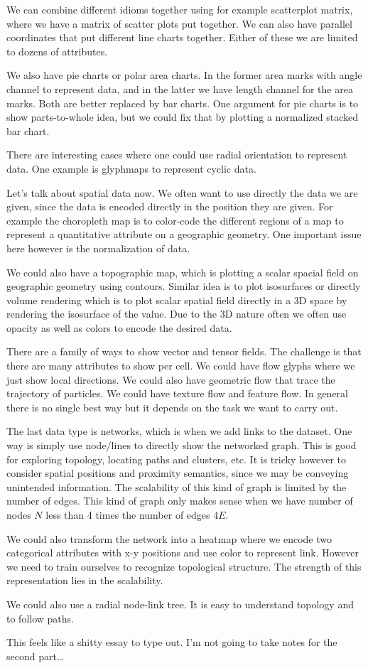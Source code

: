 \documentclass[letterpaper, 11pt]{article}
\numberwithin{equation}{section}
\numberwithin{figure}{section}
\begin{document}
We can combine different idioms together using for example scatterplot matrix,
where we have a matrix of scatter plots put together. We can also have parallel
coordinates that put different line charts together. Either of these we are
limited to dozens of attributes.

We also have pie charts or polar area charts. In the former area marks with
angle channel to represent data, and in the latter we have length channel for
the area marks. Both are better replaced by bar charts. One argument for pie
charts is to show parts-to-whole idea, but we could fix that by plotting a
normalized stacked bar chart.

There are interesting cases where one could use radial orientation to represent
data. One example is glyphmaps to represent cyclic data.

Let's talk about spatial data now. We often want to use directly the data we are
given, since the data is encoded directly in the position they are given. For
example the choropleth map is to color-code the different regions of a map to
represent a quantitative attribute on a geographic geometry. One important issue
here however is the normalization of data.

We could also have a topographic map, which is plotting a scalar spacial field
on geographic geometry using contours. Similar idea is to plot isosurfaces or
directly volume rendering which is to plot scalar spatial field directly in a 3D
space by rendering the isosurface of the value. Due to the 3D nature often we
often use opacity as well as colors to encode the desired data.

There are a family of ways to show vector and tensor fields. The challenge is
that there are many attributes to show per cell. We could have flow glyphs where
we just show local directions. We could also have geometric flow that trace the
trajectory of particles. We could have texture flow and feature flow. In general
there is no single best way but it depends on the task we want to carry out.

The last data type is networks, which is when we add links to the dataset. One
way is simply use node/lines to directly show the networked graph. This is good
for exploring topology, locating paths and clusters, etc. It is tricky however
to consider spatial positions and proximity semantics, since we may be conveying
unintended information. The scalability of this kind of graph is limited by the
number of edges. This kind of graph only makes sense when we have number of
nodes $N$ less than 4 times the number of edges $4E$.

We could also transform the network into a heatmap where we encode two
categorical attributes with x-y positions and use color to represent link.
However we need to train ourselves to recognize topological structure. The
strength of this representation lies in the scalability.

We could also use a radial node-link tree. It is easy to understand topology and
to follow paths.


This feels like a shitty essay to type out. I'm not going to take notes for the
second part\dots
\end{document}
